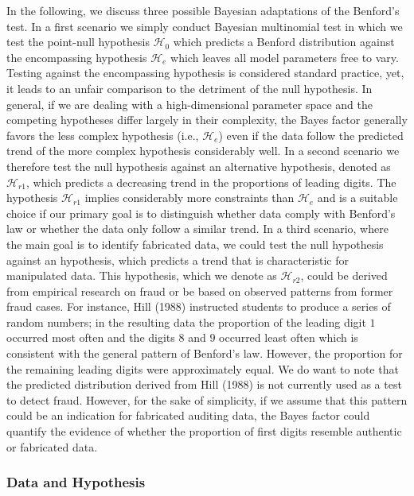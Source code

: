 \documentclass[
  english,
  man,floatsintext]{apa6}
\begin{document}
In the following, we discuss three possible Bayesian adaptations of the Benford's test. In a first scenario we simply conduct Bayesian multinomial test in which we test the point-null hypothesis \(\mathcal{H}_0\) which predicts a Benford distribution against the encompassing hypothesis \(\mathcal{H}_{e}\) which leaves all model parameters free to vary. Testing against the encompassing hypothesis is considered standard practice, yet, it leads to an unfair comparison to the detriment of the null hypothesis. In general, if we are dealing with a high-dimensional parameter space and the competing hypotheses differ largely in their complexity, the Bayes factor generally favors the less complex hypothesis (i.e., \(\mathcal{H}_{e}\)) even if the data follow the predicted trend of the more complex hypothesis considerably well. In a second scenario we therefore test the null hypothesis against an alternative hypothesis, denoted as \(\mathcal{H}_{r1}\), which predicts a decreasing trend in the proportions of leading digits. The hypothesis \(\mathcal{H}_{r1}\) implies considerably more constraints than \(\mathcal{H}_{e}\) and is a suitable choice if our primary goal is to distinguish whether data comply with Benford's law or whether the data only follow a similar trend. In a third scenario, where the main goal is to identify fabricated data, we could test the null hypothesis against an hypothesis, which predicts a trend that is characteristic for manipulated data. This hypothesis, which we denote as \(\mathcal{H}_{r2}\), could be derived from empirical research on fraud or be based on observed patterns from former fraud cases. For instance, Hill (1988) instructed students to produce a series of random numbers; in the resulting data the proportion of the leading digit \(1\) occurred most often and the digits \(8\) and \(9\) occurred least often which is consistent with the general pattern of Benford's law. However, the proportion for the remaining leading digits were approximately equal. We do want to note that the predicted distribution derived from Hill (1988) is not currently used as a test to detect fraud. However, for the sake of simplicity, if we assume that this pattern could be an indication for fabricated auditing data, the Bayes factor could quantify the evidence of whether the proportion of first digits resemble authentic or fabricated data.

\hypertarget{data-and-hypothesis}{%
\subsubsection{Data and Hypothesis}\label{data-and-hypothesis}}
\end{document}

